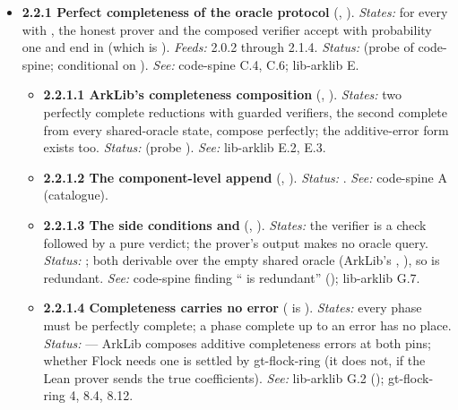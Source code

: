 \begin{itemize}[label={}, leftmargin=1.3em, itemindent=-1.3em, labelwidth=0pt, labelsep=0pt, itemsep=4pt, topsep=3pt]
\item {}\label{obl:node-2.2.1}\textbf{2.2.1 Perfect completeness of the oracle protocol} (, ). \emph{States:} for every  with , the honest prover and the composed verifier accept with probability one and end in  (which is ). \emph{Feeds:} 2.0.2 through 2.1.4. \emph{Status:}  (probe  of code-spine; conditional on ). \emph{See:} code-spine C.4, C.6; lib-arklib E.
\begin{itemize}[label={}, leftmargin=1.3em, itemindent=-1.3em, labelwidth=0pt, labelsep=0pt, itemsep=4pt, topsep=3pt]
\item {}\label{obl:node-2.2.1.1}\textbf{2.2.1.1 ArkLib's completeness composition} (, ). \emph{States:} two perfectly complete reductions with guarded verifiers, the second complete from every shared-oracle state, compose perfectly; the additive-error form exists too. \emph{Status:}  (probe ). \emph{See:} lib-arklib E.2, E.3.
\item {}\label{obl:node-2.2.1.2}\textbf{2.2.1.2 The component-level append} (, ). \emph{Status:} . \emph{See:} code-spine A (catalogue).
\item {}\label{obl:node-2.2.1.3}\textbf{2.2.1.3 The side conditions  and } (, ). \emph{States:} the verifier is a check followed by a pure verdict; the prover's output makes no oracle query. \emph{Status:} ; both derivable over the empty shared oracle (ArkLib's , ), so  is redundant. \emph{See:} code-spine finding `` is redundant'' (); lib-arklib G.7.
\item {}\label{obl:node-2.2.1.4}\oblflag\textbf{2.2.1.4 Completeness carries no error} ( is ). \emph{States:} every phase must be perfectly complete; a phase complete up to an error has no place. \emph{Status:}   — ArkLib composes additive completeness errors at both pins; whether Flock needs one is settled by gt-flock-ring (it does not, if the Lean prover sends the true coefficients). \emph{See:} lib-arklib G.2 (); gt-flock-ring 4, 8.4, 8.12.

\end{itemize}
\end{itemize}
